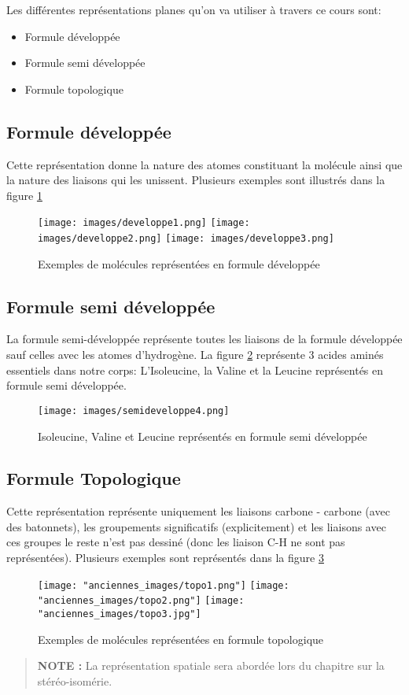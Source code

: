 Les différentes représentations planes qu'on va utiliser à travers ce cours sont:

\begin{itemize}
    \item Formule développée 
    \item Formule semi développée 
    \item Formule topologique
\end{itemize}
\subsection{Formule développée}
Cette représentation donne la nature des atomes constituant la molécule ainsi que la nature des liaisons qui les unissent. Plusieurs exemples sont illustrés dans la figure \ref{fig:developpe_examples}
\begin{figure}[!ht]
    \centering
    \texttt{[image: images/developpe1.png]}
    \texttt{[image: images/developpe2.png]}
    \texttt{[image: images/developpe3.png]}
    \caption{Exemples de molécules représentées en formule développée}
    \label{fig:developpe_examples}
\end{figure}
\subsection{Formule semi développée}
La formule semi-développée représente toutes les liaisons de la formule développée sauf celles avec les atomes d’hydrogène. La figure \ref{fig:semi_dev_example} représente 3 acides aminés essentiels dans notre corps: L'Isoleucine, la Valine et la Leucine représentés en formule semi développée.
\begin{figure}[htbp]
    \centering
    \texttt{[image: images/semideveloppe4.png]}
    \caption{Isoleucine, Valine et Leucine représentés en formule semi développée}
    \label{fig:semi_dev_example}
\end{figure}
\subsection{Formule Topologique}
Cette représentation représente uniquement les liaisons carbone - carbone (avec des batonnets), les groupements significatifs (explicitement) et les liaisons avec ces groupes le reste n'est pas dessiné (donc les liaison C-H ne sont pas représentées). Plusieurs exemples sont représentés dans la figure \ref{fig:topo_example}
\begin{figure}[ht]
    \centering
    \texttt{[image: "anciennes\_images/topo1.png"]}
    \texttt{[image: "anciennes\_images/topo2.png"]}
    \texttt{[image: "anciennes\_images/topo3.jpg"]}
    \caption{Exemples de molécules représentées en formule topologique}
    \label{fig:topo_example}
\end{figure}
\begin{quote}
    \textbf{NOTE :} La représentation spatiale sera abordée lors du chapitre sur la stéréo-isomérie.
\end{quote}